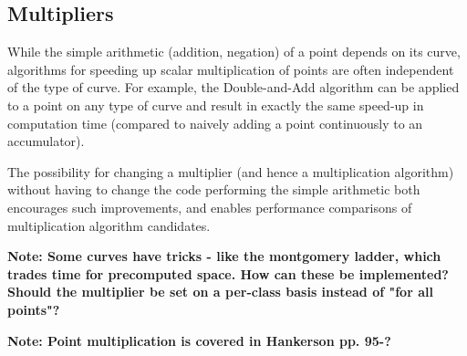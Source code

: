 \subsection{Multipliers}
\label{sec:implementation_multipliers}
\label{sec:implementation_multiplication}

While the simple arithmetic (addition, negation) of a point depends on its curve, algorithms for speeding up scalar
multiplication of points are often independent of the type of curve. For example, the Double-and-Add algorithm can
be applied to a point on any type of curve and result in exactly the same speed-up in computation time (compared to
naively adding a point continuously to an accumulator).

The possibility for changing a multiplier (and hence a multiplication algorithm) without having to change the code
performing the simple arithmetic both encourages such improvements, and enables performance comparisons of multiplication
algorithm candidates.

\textbf{Note: Some curves have tricks - like the montgomery ladder, which trades time for precomputed space. How can these
be implemented? Should the multiplier be set on a per-class basis instead of "for all points"?}

\textbf{Note: Point multiplication is covered in Hankerson pp. 95-?}
